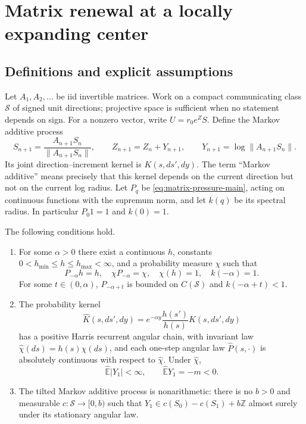 \section{Matrix renewal at a locally expanding center}
\label{app:matrix-renewal}

\subsection{Definitions and explicit assumptions}
Let $A_1,A_2,\ldots$ be iid invertible matrices. Work on a compact
communicating class $\mathcal S$ of signed unit directions; projective
space is sufficient when no statement depends on sign. For a nonzero
vector, write $U=r_0e^Z S$. Define the Markov additive process
\begin{equation}
 S_{n+1}=\frac{A_{n+1}S_n}{\|A_{n+1}S_n\|},\qquad
 Z_{n+1}=Z_n+Y_{n+1},\qquad
 Y_{n+1}=\log\|A_{n+1}S_n\|.
 \label{eq:map-exact}
\end{equation}
Its joint direction--increment kernel is $K(s,ds',dy)$. The term
``Markov additive'' means precisely that this kernel depends on the
current direction but not on the current log radius. Let $P_q$ be
\eqref{eq:matrix-pressure-main}, acting on continuous functions with
the supremum norm, and let $k(q)$ be its spectral radius. In particular
$P_0 1=1$ and $k(0)=1$.

\begin{assumption}
\label{ass:matrix-renewal}
The following conditions hold.
\begin{enumerate}
\item For some $\alpha>0$ there exist a continuous $h$, constants
$0<h_{\min}\le h\le h_{\max}<\infty$, and a probability measure $\chi$
such that
\begin{equation}
 P_{-\alpha}h=h,\quad \chi P_{-\alpha}=\chi,\quad
 \chi(h)=1,\quad k(-\alpha)=1.
 \label{eq:matrix-eigen}
\end{equation}
For some $t\in(0,\alpha)$, $P_{-\alpha+t}$ is bounded on
$C(\mathcal S)$ and $k(-\alpha+t)<1$.
\item The probability kernel
\begin{equation}
 \widehat K(s,ds',dy)
   =e^{-\alpha y}\frac{h(s')}{h(s)}K(s,ds',dy)
 \label{eq:matrix-tilt}
\end{equation}
has a positive Harris recurrent angular chain, with invariant law
$\widehat\chi(ds)=h(s)\chi(ds)$, and each one-step angular law
$\widehat P(s,\cdot)$ is absolutely continuous with respect to
$\widehat\chi$. Under $\widehat\chi$,
\begin{equation}
 \widehat{\mathbb E}|Y_1|<\infty,
 \qquad \widehat{\mathbb E}Y_1=-m<0.
 \label{eq:matrix-tilt-drift}
\end{equation}
\item The tilted Markov additive process is nonarithmetic: there is no
$b>0$ and measurable $c:\mathcal S\to[0,b)$ such that
$Y_1\in c(S_0)-c(S_1)+b\mathbb Z$ almost surely under its stationary
angular law.
\end{enumerate}
\end{assumption}

